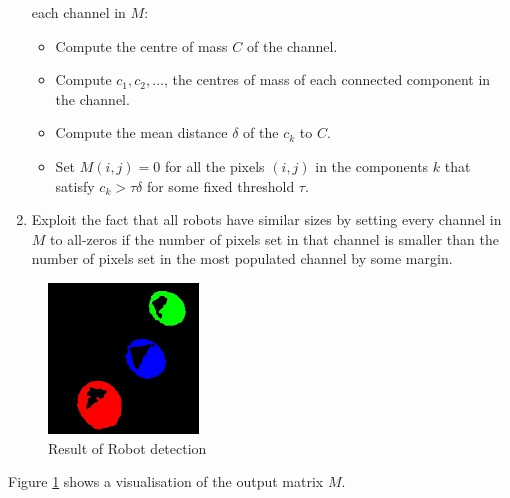 \documentclass[10pt,a4paper]{article}
\begin{document}
\begin{enumerate}
    each channel in $M$:
    \begin{itemize}
        \item
        Compute the centre of mass $C$ of the channel.
        \item
        Compute $c_1, c_2, \ldots$, the centres of mass of each connected 
        component in the channel.
        \item
        Compute the mean distance $\delta$ of the $c_k$ to $C$.
        \item
        Set $M(i,j) = 0$ for all the pixels $(i,j)$ in the components $k$ that
        satisfy $c_k > \tau \delta$ for some fixed threshold $\tau$.
    \end{itemize}
    \item
    Exploit the fact that all robots have similar sizes by setting every channel
    in $M$ to all-zeros if the number of pixels set in that channel is smaller
    than the number of pixels set in the most populated channel by some margin.
\end{enumerate} 
\begin{figure}[ht]
    \centering
    \includegraphics[width=40mm]{src/d1_i5_blob_mask.jpg}
    \caption{Result of Robot detection}
    \label{colorfig}
\end{figure} 
Figure \ref{colorfig} shows a visualisation of the output matrix $M$.
\end{document}
